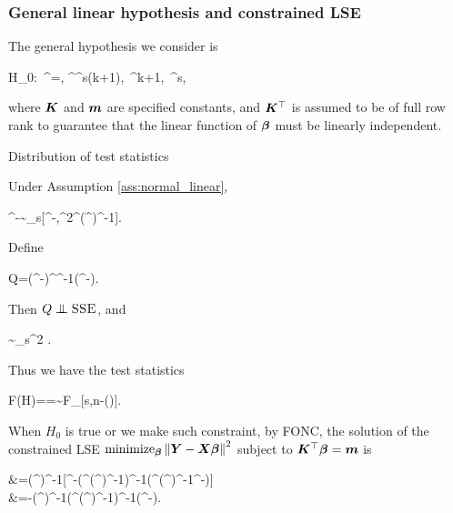 \documentclass[10pt,a4paper]{book}
\begin{document}
\subsubsection{General linear hypothesis and constrained LSE}\label{sec:LR_full_rank_normal_general_linear_hypo}
The general hypothesis we consider is
\begin{sequation*}
	H_0:\ \K^\TT \bab=\m, \quad \K^\TT\in\bbR^{s\times (k+1)},\ \bab\in\bbR^{k+1},\ \m\in\bbR^s,
\end{sequation*}
where ${\boldsymbol K}$ and ${\boldsymbol m}$ are specified constants, and ${\boldsymbol K}^\top$ is assumed to be of full row rank to guarantee that the linear function of ${\boldsymbol\beta}$ must be linearly independent.
\begin{thmbox}{Distribution of test statistics}
	\begin{proposition}\label{prop:LR_full_rank_normal_general_linear_hypo}
		Under Assumption \ref{ass:normal_linear}, 
		\begin{sequation*}
			\K^\TT\hat{\bab}-\m\sim\rmN_s[\K^\TT\bab-\m,\sigma^2\K^\TT(\X^\TT\X)^{-1}\K].
		\end{sequation*}
		Define 
		\begin{sequation*}
			Q=(\K^\TT\hat{\bab}-\m)^\TT [\K^\TT(\X^\TT\X)^{-1}\K]^{-1}(\K^\TT\hat{\bab}-\m).
		\end{sequation*}
		Then $Q\indep\SSE$, and 
		\begin{sequation*}
			\sim\chi_{s}^2 \cbk{\sigma^{-2}(\K^\TT{\bab}-\m)^\TT [\K^\TT(\X^\TT\X)^{-1}\K]^{-1}(\K^\TT{\bab}-\m)}.
		\end{sequation*}
		Thus we have the test statistics 
		\begin{sequation*}
			F(H)==\sim\textsc{F}_{[s,n-\rmr(\X)]}\cbk{\sigma^{-2}(\K^\TT{\bab}-\m)^\TT [\K^\TT(\X^\TT\X)^{-1}\K]^{-1}(\K^\TT{\bab}-\m)}.
		\end{sequation*}
	\end{proposition}
\end{thmbox}
When $H_0$ is true or we make such constraint, by FONC, the solution of the constrained LSE $\mathrm{minimize}_{{\boldsymbol\beta}}\left\lVert{\boldsymbol Y}-{\boldsymbol X}{\boldsymbol\beta}\right\rVert^2$ subject to ${\boldsymbol K}^\top{\boldsymbol\beta}={\boldsymbol m}$ is 
\begin{salign*}
	\tilde{\bab}&=(\X^\top \X)^{-1}[\X^\top \Y-\K(\K^\top(\X^\top \X)^{-1}\K)^{-1}(\K^\top(\X^\top \X)^{-1}\X^\top \Y-\m)]\\
	&=\hat{\bab}-(\X^\top \X)^{-1}\K(\K^\top(\X^\top \X)^{-1}\K)^{-1}(\K^\top\hat{\bab}-\m).
\end{salign*}   
\end{document}
